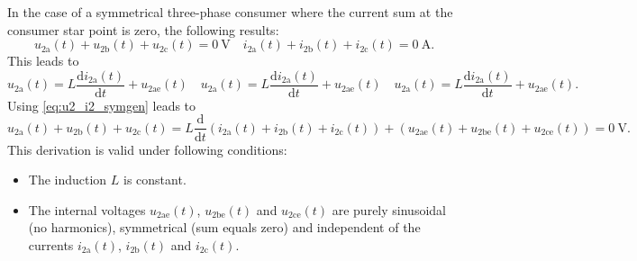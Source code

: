 \begin{solutionblock}
    In the case of a symmetrical three-phase consumer where the current sum at the consumer star point is zero, 
    the following results:
    \begin{equation}
        u_{\mathrm{2a}}(t) + u_{\mathrm{2b}}(t) + u_{\mathrm{2c}}(t) = \SI{0}{\volt} \quad 
        i_{\mathrm{2a}}(t) + i_{\mathrm{2b}}(t) + i_{\mathrm{2c}}(t) = \SI{0}{\ampere}.
        \label{eq:u2_i2_symgen}        
    \end{equation}
    This leads to
    \begin{equation}
        u_{\mathrm{2a}}(t) = L \frac{\mathrm{d}i_{\mathrm{2a}}(t)}{\mathrm{d}t}+u_{\mathrm{2ae}}(t)
        \quad u_{\mathrm{2a}}(t) = L \frac{\mathrm{d}i_{\mathrm{2a}}(t)}{\mathrm{d}t}+u_{\mathrm{2ae}}(t)
        \quad u_{\mathrm{2a}}(t) = L \frac{\mathrm{d}i_{\mathrm{2a}}(t)}{\mathrm{d}t}+u_{\mathrm{2ae}}(t).
        \label{eq:u2_i2_symL}         
    \end{equation}
    Using \eqref{eq:u2_i2_symgen} leads to
    \begin{equation}
        u_{\mathrm{2a}}(t) + u_{\mathrm{2b}}(t) + u_{\mathrm{2c}}(t) 
        = L \frac{\mathrm{d}}{\mathrm{d}t} \left( i_{\mathrm{2a}}(t)+i_{\mathrm{2b}}(t)+i_{\mathrm{2c}}(t) \right) 
         + \left( u_{\mathrm{2ae}}(t) + u_{\mathrm{2be}}(t) + u_{\mathrm{2ce}}(t)\right)=\SI{0}{\volt}.
        \label{eq:u2_i2_symres} 
    \end{equation}
    This derivation is valid under following conditions:
    \begin{itemize}
        \item The induction $L$ is constant.
        \item The internal voltages $u_{\mathrm{2ae}}(t)$, $u_{\mathrm{2be}}(t)$ and $u_{\mathrm{2ce}}(t)$ 
        are purely sinusoidal (no harmonics), symmetrical (sum equals zero) and independent of the currents
        $i_{\mathrm{2a}}(t)$, $i_{\mathrm{2b}}(t)$ and $i_{\mathrm{2c}}(t)$.
    \end{itemize}     
\end{solutionblock}

